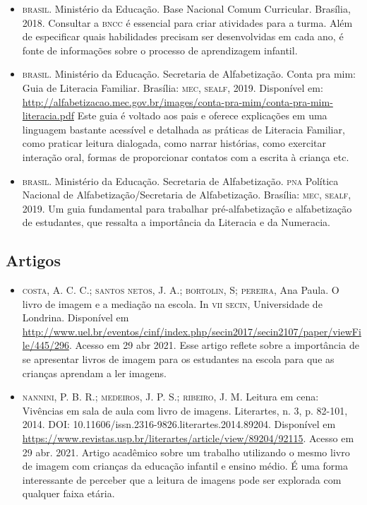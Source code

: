\documentclass[11pt]{extarticle}
\begin{document}
\begin{itemize}
\item \textsc{brasil}. Ministério da Educação. Base Nacional Comum Curricular. Brasília, 2018.
Consultar a \textsc{bncc} é essencial para criar atividades para a turma. Além de especificar 
quais habilidades precisam ser desenvolvidas em cada ano, é fonte de informações sobre 
o processo de aprendizagem infantil. 

\item \textsc{brasil}. Ministério da Educação. Secretaria de Alfabetização. Conta pra mim: Guia de Literacia Familiar. 
Brasília: \textsc{mec, sealf}, 2019. Disponível em: \url{http://alfabetizacao.mec.gov.br/images/conta-pra-mim/conta-pra-mim-literacia.pdf}
Este guia é voltado aos pais e oferece explicações em uma linguagem bastante acessível e detalhada as práticas de Literacia Familiar, 
como praticar leitura dialogada, como narrar histórias, como exercitar interação oral, formas de proporcionar contatos com a escrita à criança etc. 
 
\item \textsc{brasil}. Ministério da Educação. Secretaria de Alfabetização. \textsc{pna} Política Nacional de Alfabetização/Secretaria 
de Alfabetização. Brasília: \textsc{mec, sealf}, 2019.
Um guia fundamental para trabalhar pré-alfabetização e alfabetização de estudantes, que ressalta a importância da Literacia e da Numeracia. 


\end{itemize}


\subsection{Artigos}

\begin{itemize}
\item \textsc{costa}, A. C. C.; \textsc{santos netos}, J. A.; \textsc{bortolin}, S; \textsc{pereira}, Ana Paula. O livro de imagem e a mediação na escola. 
In \textsc{vii secin}, Universidade de Londrina. Disponível em \url{http://www.uel.br/eventos/cinf/index.php/secin2017/secin2107/paper/viewFile/445/296}. 
Acesso em 29 abr 2021. 
Esse artigo reflete sobre a importância de se apresentar livros de imagem para os estudantes na escola para que as crianças aprendam a ler imagens. 

\item \textsc{nannini}, P. B. R.; \textsc{medeiros}, J. P. S.; \textsc{ribeiro}, J. M. Leitura em cena: Vivências em sala de aula com livro de imagens. 
Literartes, n. 3, p. 82-101, 2014. DOI: 10.11606/issn.2316-9826.literartes.2014.89204. 
Disponível em \url{https://www.revistas.usp.br/literartes/article/view/89204/92115}. Acesso em 29 abr. 2021. 
Artigo acadêmico sobre um trabalho utilizando o mesmo livro de imagem com crianças da educação infantil e ensino médio. 
É uma forma interessante de perceber que a leitura de imagens pode ser explorada com qualquer faixa etária. 
\end{itemize}

% 
\end{document}
